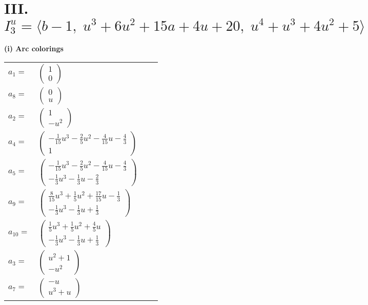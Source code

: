 \documentclass[1p]{elsarticle_modified}
\theoremstyle{definition}
\begin{document}
\centering \section*{III. $I^u_{3}= \langle b-1,\;u^3+6 u^2+15 a+4 u+20,\;u^4+u^3+4 u^2+5 \rangle$}
\flushleft \textbf{(i) Arc colorings}\\
\begin{tabular}{m{7pt} m{180pt} m{7pt} m{180pt} }
\flushright $a_{1}=$&$\begin{pmatrix}1\\0\end{pmatrix}$ \\
\flushright $a_{8}=$&$\begin{pmatrix}0\\u\end{pmatrix}$ \\
\flushright $a_{2}=$&$\begin{pmatrix}1\\- u^2\end{pmatrix}$ \\
\flushright $a_{4}=$&$\begin{pmatrix}-\frac{1}{15} u^3-\frac{2}{5} u^2-\frac{4}{15} u-\frac{4}{3}\\1\end{pmatrix}$ \\
\flushright $a_{5}=$&$\begin{pmatrix}-\frac{1}{15} u^3-\frac{2}{5} u^2-\frac{4}{15} u-\frac{4}{3}\\-\frac{1}{3} u^3-\frac{1}{3} u-\frac{2}{3}\end{pmatrix}$ \\
\flushright $a_{9}=$&$\begin{pmatrix}\frac{8}{15} u^3+\frac{1}{5} u^2+\frac{17}{15} u-\frac{1}{3}\\-\frac{1}{3} u^3-\frac{1}{3} u+\frac{1}{3}\end{pmatrix}$ \\
\flushright $a_{10}=$&$\begin{pmatrix}\frac{1}{5} u^3+\frac{1}{5} u^2+\frac{4}{5} u\\-\frac{1}{3} u^3-\frac{1}{3} u+\frac{1}{3}\end{pmatrix}$ \\
\flushright $a_{3}=$&$\begin{pmatrix}u^2+1\\- u^2\end{pmatrix}$ \\
\flushright $a_{7}=$&$\begin{pmatrix}- u\\u^3+u\end{pmatrix}$ \\

\end{tabular}
\end{document}
